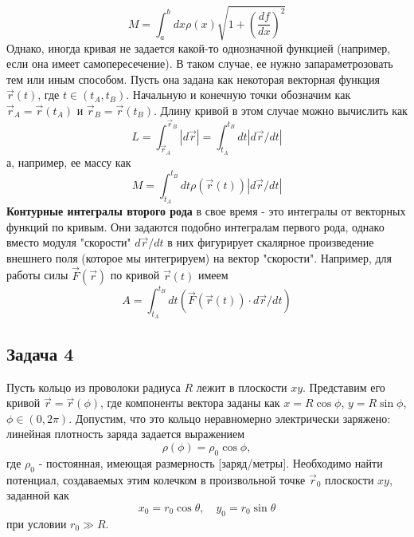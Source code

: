 \documentclass[a4paper,12pt]{article}
\begin{document}
\[
M	=\int_{a}^{b}dx\rho(x)\sqrt{1+\left(\frac{df}{dx}\right)^{2}}
\]
\bigskip
\noindent
Однако, иногда кривая не задается какой-то однозначной функцией (например, если она имеет самопересечение). В таком случае, ее нужно запараметрозовать тем или иным способом. Пусть она задана как некоторая векторная функция $\vec{r}(t)$,	где $t\in(t_{A},t_{B})$. Начальную и конечную точки обозначим как $\vec{r}_{A}=\vec{r}(t_{A})$ и $\vec{r}_{B}=\vec{r}(t_{B})$. Длину кривой в этом случае можно вычислить как
\[
L	=\int_{\vec{r}_{A}}^{\vec{r}_{B}}|d\vec{r}|=\int_{t_{A}}^{t_{B}}dt|d\vec{r}/dt|
\]
а, например, ее массу как
\[
M	=\int_{t_{A}}^{t_{B}}dt\rho(\vec{r}(t))|d\vec{r}/dt|
\]
\noindent
\textbf{Контурные интегралы второго рода} в свое время - это интегралы от векторных функций по кривым. Они задаются подобно интегралам первого рода, однако вместо модуля "скорости"  $d\vec{r}/dt$ в них фигурирует скалярное произведение внешнего поля (которое мы интегрируем) на вектор "скорости".  Например, для работы силы $\vec{F}(\vec{r})$ по кривой $\vec{r}(t)$ имеем
$$
A	=\int_{t_{A}}^{t_{B}}dt\left(\vec{F}(\vec{r}(t))\cdot d\vec{r}/dt\right)
$$
\subsection*{Задача 4}
Пусть кольцо из проволоки радиуса $R$ лежит в плоскости $xy$. Представим его кривой $\vec{r}=\vec{r}(\phi)$, где компоненты вектора заданы как
$x	=R\cos\phi$, $y=R\sin\phi$, $\phi\in(0,2\pi)$. Допустим, что это кольцо неравномерно электрически заряжено: линейная плотность заряда задается выражением
$$\rho(\phi)	=\rho_{0}\cos\phi,$$
где $\rho_{0}$ - постоянная, имеющая размерность [заряд/метры]. Необходимо найти потенциал, создаваемых этим колечком в произвольной точке $\vec{r}_{0}$ плоскости $xy$, заданной как
$$x_{0}	=r_{0}\cos\theta,\quad y_{0}=r_{0}\sin\theta$$
при условии $r_{0}\gg R$.
\end{document}

